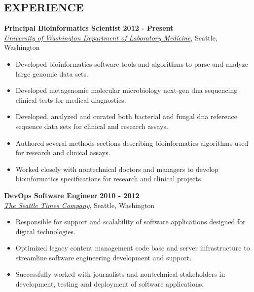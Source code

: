 \documentclass{res}
\begin{document}

\address{Seattle, WA}
\address{crosenth@gmail.com}

\begin{resume}

\section{EXPERIENCE}

\textbf{Principal Bioinformatics Scientist} \hfill \textbf{2012 - Present}\\
\href{http://depts.washington.edu/labweb/}{\textit{University of Washington Department of Laboratory Medicine}}, 
Seattle, Washington
\begin{itemize} \itemsep -2pt
\item Developed bioinformatics software tools and algorithms to parse and analyze large genomic data sets.
\item Developed metagenomic molecular microbiology next-gen dna sequencing clinical tests for medical diagnostics.
\item Developed, analyzed and curated both bacterial and fungal dna reference sequence data sets for clinical and research assays.
\item Authored several methods sections describing bioinformatics algorithms used for research and clinical assays.
\item Worked closely with nontechnical doctors and managers to develop bioinformatics specifications for research and clinical projects.
\end{itemize}

\textbf{DevOps Software Engineer} \hfill \textbf{2010 - 2012}\\
\href{http://www.seattletimes.com/}{\textit{The Seattle Times Company}}, Seattle, Washington
\begin{itemize} \itemsep -2pt
\item Responsible for support and scalability of software applications designed for digital technologies.
\item Optimized legacy content management code base and server infrastructure to streamline software engineering development and support.
\item Successfully worked with journalists and nontechnical stakeholders in development, testing and deployment of software applications.
\end{itemize}


\end{resume}
\end{document}
